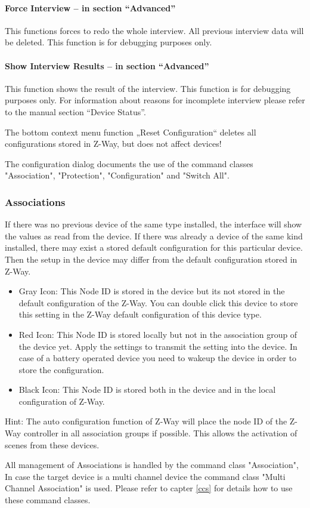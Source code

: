 \paragraph{Force Interview – in section “Advanced”}

This functions forces to redo the whole interview. All previous interview data will be deleted. This function is for debugging purposes only.

\paragraph{Show Interview Results – in section “Advanced”}

This function shows the result of the interview. This function is for debugging purposes only. For information about reasons for incomplete interview please refer to the manual section “Device Status”.

The bottom context menu function  „Reset Configuration“ deletes all configurations stored in Z-Way, but does not affect devices!



The configuration dialog documents the use of the command classes "Association", "Protection", "Configuration" and "Switch All".
  
\subsubsection{Associations}


If there was no previous device of the same type installed, the interface will show the values as read from the device. If there was already a device of the same kind installed, there may exist a stored default configuration for this particular device. Then the setup in the device may differ from the default configuration stored in Z-Way.
\begin{itemize}
\item Gray Icon: This Node ID is stored in the device but its not stored in the default configuration of the Z-Way. You can double click this device to store this setting in the Z-Way default configuration of this device type.
\item Red Icon: This Node ID is stored locally but not in the association group of the device yet. Apply the settings to transmit the setting into the device.  In case of a battery operated device you need to wakeup the device in order to store the configuration.
\item Black Icon: This Node ID is stored both in the device and in the local configuration of Z-Way.
\end{itemize}
Hint: The auto configuration function of Z-Way will place the node ID of the Z-Way controller in all association 
groups if possible. This allows the activation of scenes from these devices. 

All management of Associations is handled by the command class "Association", In case the target device is a multi 
channel device the command class "Multi Channel Association" is used. Please refer to capter \ref{ccs} for details how to use these command classes.





